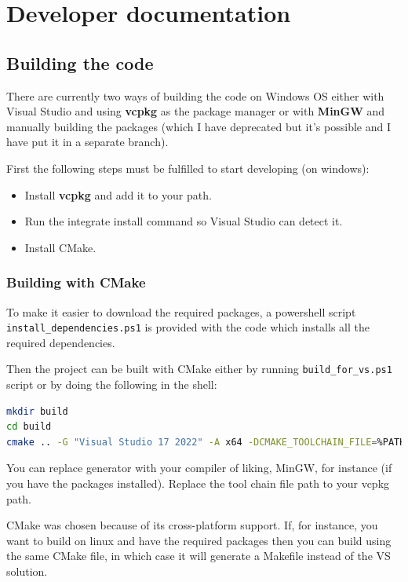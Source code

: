 \chapter{Developer documentation}
\label{ch:impl}

\section{Building the code}

There are currently two ways of building the code on Windows OS either with Visual Studio and using \textbf{vcpkg} as the package manager or with \textbf{MinGW} and manually building the packages (which I have deprecated but it's possible and I have put it in a separate branch).

First the following steps must be fulfilled to start developing (on windows):

\begin{itemize}
	\item Install \textbf{vcpkg} and add it to your path.
	\item Run the integrate install command so Visual Studio can detect it.
	\item Install CMake.
\end{itemize}

\subsection{Building with CMake}

To make it easier to download the required packages, a powershell script \texttt{install\_dependencies.ps1} is provided with the code which installs all the required dependencies.

Then the project can be built with CMake either by running \texttt{build\_for\_vs.ps1} script or by doing the following in the shell:
\begin{lstlisting}[language=bash]
mkdir build
cd build
cmake .. -G "Visual Studio 17 2022" -A x64 -DCMAKE_TOOLCHAIN_FILE=%PATH_TO_VCPKG%/scripts/buildsystems/vcpkg.cmake
\end{lstlisting}

You can replace generator with your compiler of liking, MinGW, for instance (if you have the packages installed). Replace the tool chain file path to your vcpkg path. 

CMake was chosen because of its cross-platform support. If, for instance, you want to build on linux and have the required packages then you can build using the same CMake file, in which case it will generate a Makefile instead of the VS solution.

